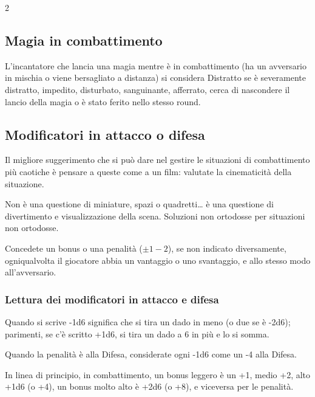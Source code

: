 \begin{multicols}{2}
\subsection{Magia in combattimento}\label{magiaincombattimento}

L'incantatore che lancia una magia mentre è in combattimento (ha un avversario in mischia o viene bersagliato a distanza) si considera Distratto se è severamente distratto, impedito, disturbato, sanguinante, afferrato, cerca di nascondere il lancio della magia o è stato ferito nello stesso round.

%

\subsection{Modificatori in attacco o difesa} \label{modificatoriattaccodifesaparticolari}

Il migliore suggerimento che si può dare nel gestire le situazioni di combattimento più caotiche è pensare a queste come a un film: valutate la cinematicità della situazione.

Non è una questione di miniature, spazi o quadretti… è una questione di divertimento e visualizzazione della scena. Soluzioni non ortodosse per situazioni non ortodosse.

Concedete un bonus o una penalità ($\pm 1-2$), se non indicato diversamente, ogniqualvolta il giocatore abbia un vantaggio o uno svantaggio, e allo stesso modo all'avversario.


\subsubsection{Lettura dei modificatori in attacco e difesa} \label{letturamodificatoriattaccodifesaparticolari}

Quando si scrive -1d6 significa che si tira un dado in meno (o due se è -2d6); parimenti, se c'è scritto +1d6, si tira un dado a 6 in più e lo si somma.

Quando la penalità è alla Difesa, considerate ogni -1d6 come un -4 alla Difesa.

\medskip

In linea di principio, in combattimento, un bonus leggero è un +1, medio +2, alto +1d6 (o +4), un bonus molto alto è +2d6 (o +8), e viceversa per le penalità.


\medskip

\end{multicols}

